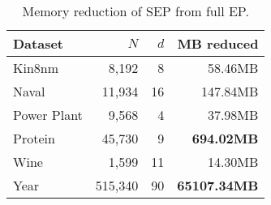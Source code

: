\begin{table} 
\small
\centering 
\begin{tabular}{lrrr}\hline \bf{Dataset}& $N$ & $d$ & MB reduced\\ \hline 
Kin8nm & 8,192 & 8 & 58.46MB \\ 
Naval & 11,934 & 16 & 147.84MB\\ 
Power Plant & 9,568 & 4 & 37.98MB\\ 
Protein & 45,730 & 9 & \bf{694.02MB}\\ 
Wine & 1,599 & 11 & 14.30MB\\ 
Year & 515,340 & 90 & \bf{65107.34MB}\\ \hline 
\end{tabular} 
\caption{ Memory reduction of SEP from full EP. } \label{tab:memory} 
\end{table} 
%


